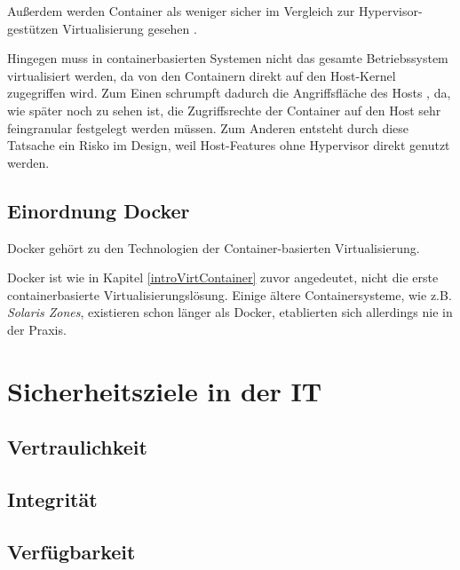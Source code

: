 \documentclass[../main.tex]{subfiles}
\begin{document}
      Außerdem werden Container als weniger sicher im Vergleich zur Hypervisor-gestützen Virtualisierung gesehen \cite[S.6]{dockerBook}.

      Hingegen muss in containerbasierten Systemen nicht das gesamte Betriebssystem virtualisiert werden, da von den Containern direkt auf den Host-Kernel zugegriffen wird. Zum Einen schrumpft dadurch die Angriffsfläche des Hosts \cite[S.6]{dockerBook}, da, wie später noch zu sehen ist, die Zugriffsrechte der Container auf den Host sehr feingranular festgelegt werden müssen. Zum Anderen entsteht durch diese Tatsache ein Risko im Design, weil Host-Features ohne Hypervisor direkt genutzt werden.

	  \subsection{Einordnung Docker}
      Docker gehört zu den Technologien der Container-basierten Virtualisierung.


      Docker ist wie in Kapitel \ref{introVirtContainer} zuvor angedeutet, nicht die erste containerbasierte Virtualisierungslösung. Einige ältere Containersysteme, wie z.B. \emph{Solaris Zones}, existieren schon länger als Docker, etablierten sich allerdings nie in der Praxis.
  \section{Sicherheitsziele in der IT}
  \label{introSecGoals}
    \subsection{Vertraulichkeit}
    \subsection{Integrität}
    \subsection{Verfügbarkeit}
\end{document}
